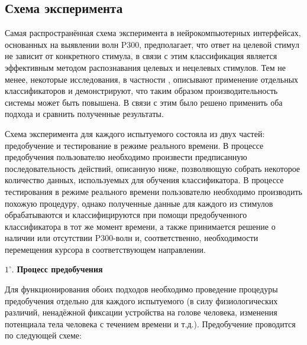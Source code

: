 \documentclass[12pt,fleqn]{article}
\begin{document}
\subsection{Схема эксперимента}
	\par Самая распространённая схема эксперимента в нейрокомпьютерных интерфейсах, основанных на выявлении волн P300, предполагает, что ответ на целевой стимул не зависит от конкретного стимула, в связи с этим классификация является эффективным методом распознавания целевых и нецелевых стимулов. Тем не менее, некоторые исследования, в частности \cite{ensemble}, описывают применение отдельных классификаторов и демонстрируют, что таким образом производительность системы может быть повышена. В связи с этим было решено применить оба подхода и сравнить полученные результаты.
	\par Схема эксперимента для каждого испытуемого состояла из двух частей: предобучение и тестирование в режиме реального времени. В процессе предобучения пользователю необходимо произвести предписанную последовательность действий, описанную ниже, позволяющую собрать некоторое количество данных, используемых для обучения классификатора. В процессе тестирования в режиме реального времени пользователю необходимо производить похожую процедуру, однако полученные данные для каждого из стимулов обрабатываются и классифицируются при помощи предобученного классификатора в тот же момент времени, а также принимается решение о наличии или отсутствии P300-волн и, соответственно, необходимости перемещения курсора в соответствующем направлении.
	\par $1^{\circ}.$ {\bf Процесс предобучения}
	\par Для функционирования обоих подходов необходимо проведение процедуры предобучения отдельно для каждого испытуемого (в силу физиологических различий, ненадёжной фиксации устройства на голове человека, изменения потенциала тела человека с течением времени и т.д.). Предобучение проводится по следующей схеме:
\end{document}
